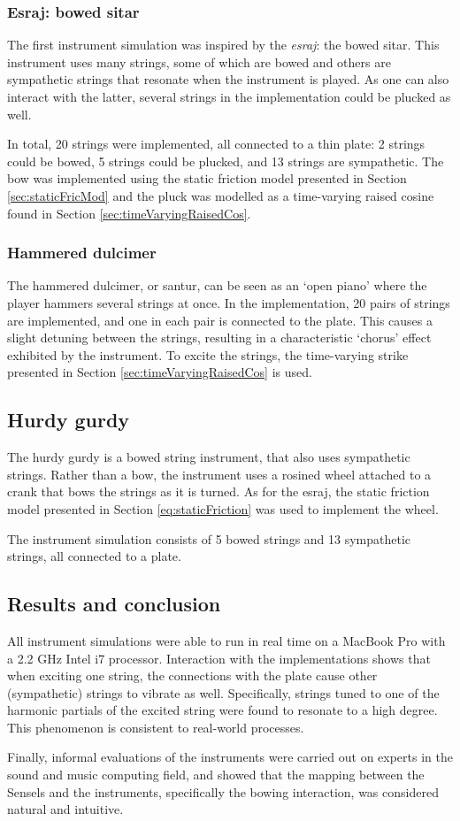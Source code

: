 \subsubsection{Esraj: bowed sitar}
The first instrument simulation was inspired by the \textit{esraj}: the bowed sitar. This instrument uses many strings, some of which are bowed and others are sympathetic strings that resonate when the instrument is played. As one can also interact with the latter, several strings in the implementation could be plucked as well. 

In total, 20 strings were implemented, all connected to a thin plate: 2 strings could be bowed, 5 strings could be plucked, and 13 strings are sympathetic. The bow was implemented using the static friction model presented in Section \ref{sec:staticFricMod} and the pluck was modelled as a time-varying raised cosine found in Section \ref{sec:timeVaryingRaisedCos}.

\subsubsection{Hammered dulcimer}
The hammered dulcimer, or santur, can be seen as an `open piano' where the player hammers several strings at once. In the implementation, 20 pairs of strings are implemented, and one in each pair is connected to the plate. This causes a slight detuning between the strings, resulting in a characteristic `chorus' effect exhibited by the instrument. To excite the strings, the time-varying strike presented in Section \ref{sec:timeVaryingRaisedCos} is used.

\subsection{Hurdy gurdy}
The hurdy gurdy is a bowed string instrument, that also uses sympathetic strings. Rather than a bow, the instrument uses a rosined wheel attached to a crank that bows the strings as it is turned. As for the esraj, the static friction model presented in Section \ref{eq:staticFriction} was used to implement the wheel. 

The instrument simulation consists of 5 bowed strings and 13 sympathetic strings, all connected to a plate. 

\subsection{Results and conclusion}
All instrument simulations were able to run in real time on a MacBook Pro with a 2.2 GHz Intel i7 processor.
Interaction with the implementations shows that when exciting one string, the connections with the plate cause other (sympathetic) strings to vibrate as well. Specifically, strings tuned to one of the harmonic partials of the excited string were found to resonate to a high degree. This phenomenon is consistent to real-world processes.

Finally, informal evaluations of the instruments were carried out on experts in the sound and music computing field, and showed that the mapping between the Sensels and the instruments, specifically the bowing interaction, was considered natural and intuitive.